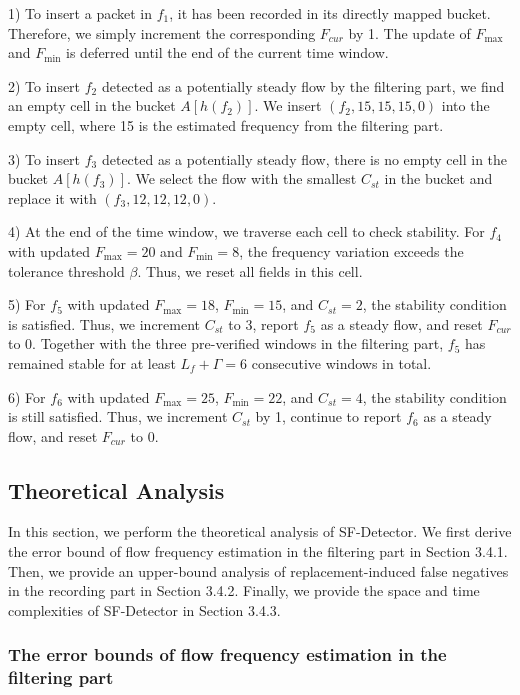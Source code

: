\documentclass[preprint,12pt]{elsarticle}
\begin{document}
1) To insert a packet in $f_1$, it has been recorded in its directly mapped bucket. Therefore, we simply increment the corresponding $F_{cur}$ by 1. The update of $F_{\max}$ and $F_{\min}$ is deferred until the end of the current time window.

2) To insert $f_2$ detected as a potentially steady flow by the filtering part, we find an empty cell in the bucket $A[h(f_2)]$. We insert $(f_2, 15, 15, 15, 0)$ into the empty cell, where 15 is the estimated frequency from the filtering part.

3) To insert $f_3$ detected as a potentially steady flow, there is no empty cell in the bucket $A[h(f_3)]$. We select the flow with the smallest $C_{st}$ in the bucket and replace it with $(f_3, 12, 12, 12, 0)$.

4) At the end of the time window, we traverse each cell to check stability. For $f_4$ with updated $F_{\max} = 20$ and $F_{\min} = 8$, the frequency variation exceeds the tolerance threshold $\beta$. Thus, we reset all fields in this cell.

5) For $f_5$ with updated $F_{\max} = 18$, $F_{\min} = 15$, and $C_{st} = 2$, the stability condition is satisfied. Thus, we increment $C_{st}$ to 3, report $f_5$ as a steady flow, and reset $F_{cur}$ to 0. Together with the three pre-verified windows in the filtering part, $f_5$ has remained stable for at least $L_f + \Gamma = 6$ consecutive windows in total.

6) For $f_6$ with updated $F_{\max} = 25$, $F_{\min} = 22$, and $C_{st} = 4$, the stability condition is still satisfied. Thus, we increment $C_{st}$ by 1, continue to report $f_6$ as a steady flow, and reset $F_{cur}$ to 0.

\subsection{Theoretical Analysis}
In this section, we perform the theoretical analysis of SF-Detector. We first derive the error bound of flow frequency estimation in the filtering part in Section 3.4.1. Then, we provide an upper-bound analysis of replacement-induced false negatives in the recording part in Section 3.4.2. Finally, we provide the space and time complexities of SF-Detector in Section 3.4.3.

\subsubsection{The error bounds of flow frequency estimation in the filtering part}
\end{document}
